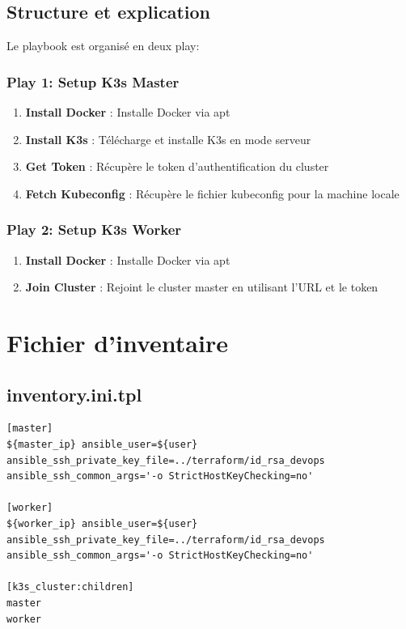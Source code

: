 \documentclass[12pt,a4paper,twoside]{report}
\begin{document}
\subsection{Structure et explication}

Le playbook est organisé en deux play:

\subsubsection{Play 1: Setup K3s Master}

\begin{enumerate}
    \item \textbf{Install Docker} : Installe Docker via apt
    \item \textbf{Install K3s} : Télécharge et installe K3s en mode serveur
    \item \textbf{Get Token} : Récupère le token d'authentification du cluster
    \item \textbf{Fetch Kubeconfig} : Récupère le fichier kubeconfig pour la machine locale
\end{enumerate}

\subsubsection{Play 2: Setup K3s Worker}

\begin{enumerate}
    \item \textbf{Install Docker} : Installe Docker via apt
    \item \textbf{Join Cluster} : Rejoint le cluster master en utilisant l'URL et le token
\end{enumerate}

\section{Fichier d'inventaire}

\subsection{inventory.ini.tpl}

\begin{lstlisting}
[master]
${master_ip} ansible_user=${user} ansible_ssh_private_key_file=../terraform/id_rsa_devops ansible_ssh_common_args='-o StrictHostKeyChecking=no'

[worker]
${worker_ip} ansible_user=${user} ansible_ssh_private_key_file=../terraform/id_rsa_devops ansible_ssh_common_args='-o StrictHostKeyChecking=no'

[k3s_cluster:children]
master
worker
\end{lstlisting}
\end{document}
